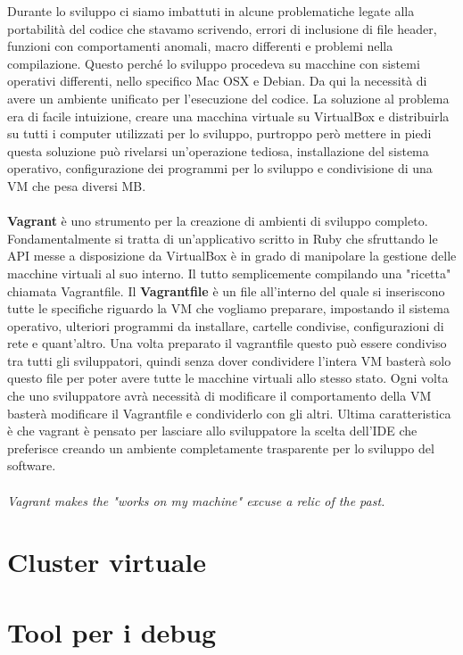 \documentclass[italian]{tktltiki2}
\begin{document}
Durante lo sviluppo ci siamo imbattuti in alcune problematiche
legate alla portabilità del codice che stavamo scrivendo, errori di inclusione di file header, funzioni con comportamenti anomali, macro differenti e problemi nella compilazione. Questo perché lo sviluppo procedeva su macchine con sistemi operativi differenti, nello specifico Mac OSX e Debian. Da qui la necessità di avere un ambiente unificato per l'esecuzione del codice. La soluzione al problema era di facile intuizione, creare una macchina virtuale su VirtualBox e distribuirla su tutti i computer utilizzati per lo sviluppo, purtroppo però mettere in piedi questa soluzione può rivelarsi un'operazione tediosa, installazione del sistema operativo, configurazione dei programmi per lo sviluppo e condivisione di una VM che pesa diversi MB.\\\\
\textbf{Vagrant} è uno strumento per la creazione di ambienti di sviluppo completo. Fondamentalmente si tratta di un’applicativo scritto in Ruby che sfruttando le API messe a disposizione da VirtualBox è in grado di manipolare la gestione delle macchine virtuali al suo interno. Il tutto semplicemente compilando una "ricetta" chiamata Vagrantfile. Il \textbf{Vagrantfile} è un file all’interno del quale si inseriscono tutte le specifiche riguardo la VM che vogliamo preparare, impostando il sistema operativo, ulteriori programmi da installare, cartelle condivise, configurazioni di rete e quant'altro. Una volta preparato il vagrantfile questo può essere condiviso tra tutti gli sviluppatori, quindi senza dover condividere l'intera VM basterà solo questo file per poter avere tutte le macchine virtuali allo stesso stato. Ogni volta che uno sviluppatore avrà necessità di modificare il comportamento della VM basterà modificare il Vagrantfile e condividerlo con gli altri. Ultima caratteristica è che vagrant è pensato per lasciare allo sviluppatore la scelta dell'IDE che preferisce creando un ambiente completamente trasparente per lo sviluppo del software.\\\\
\emph{Vagrant makes the "works on my machine" excuse a relic of the past.}

\newpage
\section{Cluster virtuale}

\newpage
\section{Tool per i debug}
\end{document}
